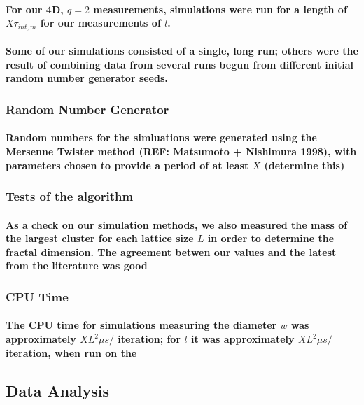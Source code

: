 \documentclass{umthesis}
\begin{document}
\paragraph{For our 4D, $q=2$ measurements, simulations were run for a length of $X \tau_{int,m}$ for our measurements of $l$.}
\label{sec-3.2.5.4.2}
\paragraph{Some of our simulations consisted of a single, long run; others were the result of combining data from several runs begun from different initial random number generator seeds.}
\label{sec-3.2.5.4.3}
\subsubsection{Random Number Generator}
\label{sec-3.2.5.5}
\paragraph{Random numbers for the simluations were generated using the Mersenne Twister method (REF:  Matsumoto + Nishimura 1998), with parameters chosen to provide a period of at least $X$ (determine this)}
\label{sec-3.2.5.5.1}
\subsubsection{Tests of the algorithm}
\label{sec-3.2.5.6}
\paragraph{As a check on our simulation methods, we also measured the mass of the largest cluster for each lattice size $L$ in order to determine the fractal dimension.  The agreement betwen our values and the latest from the literature was good}
\label{sec-3.2.5.6.1}
\subsubsection{CPU Time}
\label{sec-3.2.5.7}
\paragraph{The CPU time for simulations measuring the diameter $w$ was approximately $X L^2 \mu s /$ iteration; for $l$ it was approximately $X L^2 \mu s /$ iteration, when run on the}
\label{sec-3.2.5.7.1}
\subsection{Data Analysis}
\label{sec-3.2.6}
\end{document}
